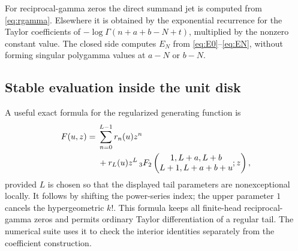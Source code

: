 For reciprocal-gamma zeros the direct summand jet is computed from
\eqref{eq:rgamma}.  Elsewhere it is obtained by the exponential recurrence
for the Taylor coefficients of
$-\log\Gamma(n+a+b-N+t)$, multiplied by the nonzero constant value.
The closed side computes $E_N$ from \eqref{eq:E0}--\eqref{eq:EN}, without
forming singular polygamma values at $a-N$ or $b-N$.

\subsection{Stable evaluation inside the unit disk}
A useful exact formula for the regularized generating function is
\begin{align}
 F(u,z)={}&\sum_{n=0}^{L-1}r_n(u)z^n\notag\\
 &+r_L(u)z^L\,
 {}_3F_2\left(\begin{matrix}1,L+a,L+b\\L+1,L+a+b+u\end{matrix};z\right),
 \label{eq:stableF}
\end{align}
provided $L$ is chosen so that the displayed tail parameters are
nonexceptional locally.  It follows by shifting the power-series index;
the upper parameter $1$ cancels the hypergeometric $k!$.
This formula keeps all finite-head reciprocal-gamma zeros and permits
ordinary Taylor differentiation of a regular tail.
The numerical suite uses it to check the interior identities separately
from the coefficient construction.

